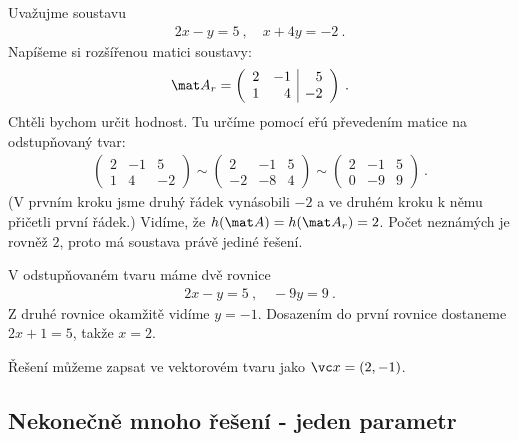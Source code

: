 \begin{example}
    Uvažujme soustavu \begin{align}
        2x - y = 5 \:, \quad  x + 4y = -2 \:.
    \end{align}
    Napíšeme si rozšířenou matici soustavy:
    \begin{align}
       \mat A_r = \left( \begin{array}{rr|r}
            2 & -1 & 5 \\ 1 & 4 & -2
        \end{array}\right) \:.
    \end{align}
    Chtěli bychom určit hodnost. Tu určíme pomocí eřú převedením matice na odstupňovaný tvar:
    \begin{align}
        \left( \begin{array}{rr|r}
            2 & -1 & 5 \\ 1 & 4 & -2
        \end{array}\right)
        \sim
        \left( \begin{array}{rr|r}
            2 & -1 & 5 \\ -2 & -8 & 4
        \end{array}\right)
        \sim
        \left( \begin{array}{rr|r}
            2 & -1 & 5 \\ 0 & -9 & 9
        \end{array}\right) \:.
    \end{align}
    (V prvním kroku jsme druhý řádek vynásobili $-2$ a ve druhém kroku k němu přičetli první řádek.)
    Vidíme, že $h(\mat A) = h(\mat A_r) = 2$. Počet neznámých je rovněž $2$, proto má soustava právě jediné řešení.

    V odstupňovaném tvaru máme dvě rovnice 
    \begin{align}
        2x - y = 5 \:, \quad -9y = 9 \:.
    \end{align}
    Z druhé rovnice okamžitě vidíme $ y = -1$. Dosazením do první rovnice dostaneme $2x + 1 =5$, takže $x = 2$.

    Řešení můžeme zapsat ve vektorovém tvaru jako $\vc x = (2,-1)$.
\end{example}

\subsection*{Nekonečně mnoho řešení - jeden parametr}

